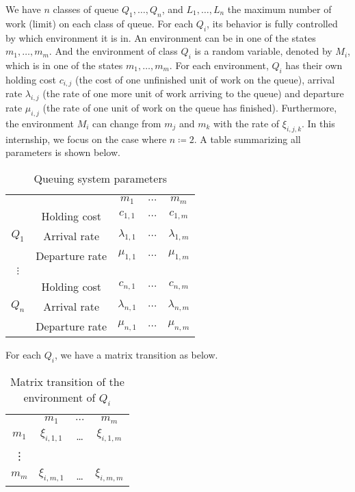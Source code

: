 \documentclass[
  a4paper, xcolor = usenames,dvipsnames]{article}
\begin{document}
We have \(n\) classes of queue \(Q_{1}, \dots, Q_{n}\), and \(L_{1}, \dots, L_{n}\) the maximum number of work (limit) on each class of queue. For each \(Q_{i}\), its behavior is fully controlled by which environment it is in. An environment can be in one of the states \(m_{1}, \dots, m_{m}\). And the environment of class \(Q_{i}\) is a random variable, denoted by \(M_{i}\), which is in one of the states \(m_{1}, \dots, m_{m}\). For each environment, \(Q_{i}\) has their own holding cost \(c_{i, j}\) (the cost of one unfinished unit of work on the queue), arrival rate \(\lambda_{i, j}\) (the rate of one more unit of work arriving to the queue) and departure rate \(\mu_{i, j}\) (the rate of one unit of work on the queue has finished). Furthermore, the environment \(M_{i}\) can change from \(m_{j}\) and \(m_{k}\) with the rate of \(\xi_{i, j, k}\). In this internship, we focus on the case where \(n \coloneq 2\). A table summarizing all parameters is shown below.

\begin{table}[ht]
\caption{Queuing system parameters}
\begin{center}
\begin{tabular}{c c c c c}
    \hline
    \multicolumn{2}{c}{} & $m_{1}$ & $\dots$ & $m_{m}$ \\
    \cline{2-5}
    \multirow{3}{*}{$Q_{1}$} &  Holding cost & $c_{1, 1}$ & $\dots$ & $c_{1, m}$ \\
    & Arrival rate & $\lambda_{1, 1}$ & $\dots$ & $\lambda_{1, m}$ \\
    & Departure rate & $\mu_{1, 1}$ & $\dots$ & $\mu_{1, m}$ \\
    \cline{2-5}
    $\vdots$  \\
    \cline{2-5}
    \multirow{3}{*}{$Q_{n}$} &  Holding cost & $c_{n, 1}$ & $\dots$ & $c_{n, m}$ \\
    & Arrival rate & $\lambda_{n, 1}$ & $\dots$ & $\lambda_{n, m}$ \\
    & Departure rate & $\mu_{n, 1}$ & $\dots$ & $\mu_{n, m}$ \\
    \hline
\end{tabular}
\end{center}
\label{tab:qs-param}
\end{table}

For each \(Q_{i}\), we have a matrix transition as below.

\begin{table}[ht]
\caption{Matrix transition of the environment of $Q_{i}$}
\begin{center}
\begin{tabular}{c c c c}
    \hline
    & $m_{1}$ & $\dots$ & $m_{m}$ \\
    $m_{1}$ & $\xi_{i, 1, 1}$ & \dots & $\xi_{i, 1, m}$ \\
    \vdots \\
    $m_{m}$ & $\xi_{i, m, 1}$ & \dots & $\xi_{i, m, m}$ \\
    \hline
\end{tabular}
\end{center}
\label{tab:mat-transition-ci}
\end{table}
\end{document}
